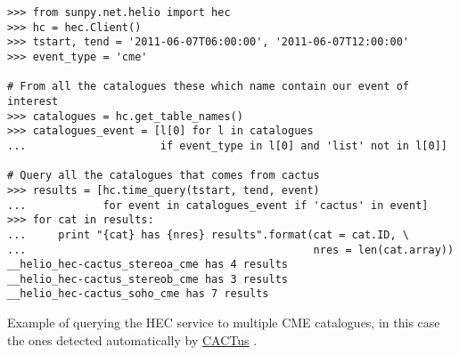 \begin{listing}[h]
\begin{verbatim}
>>> from sunpy.net.helio import hec
>>> hc = hec.Client()
>>> tstart, tend = '2011-06-07T06:00:00', '2011-06-07T12:00:00'
>>> event_type = 'cme'

# From all the catalogues these which name contain our event of interest
>>> catalogues = hc.get_table_names()
>>> catalogues_event = [l[0] for l in catalogues 
...                     if event_type in l[0] and 'list' not in l[0]]

# Query all the catalogues that comes from cactus
>>> results = [hc.time_query(tstart, tend, event) 
...            for event in catalogues_event if 'cactus' in event]
>>> for cat in results:
...     print "{cat} has {nres} results".format(cat = cat.ID, \
...                                             nres = len(cat.array))
__helio_hec-cactus_stereoa_cme has 4 results
__helio_hec-cactus_stereob_cme has 3 results
__helio_hec-cactus_soho_cme has 7 results
\end{verbatim}
\caption{Example of querying the HEC service to multiple CME
catalogues, in this case the ones detected automatically 
by \href{http://sidc.oma.be/cactus/}{CACTus} \citep{robbrecht_automated_2009}.}
\label{code:helio}
\end{listing}